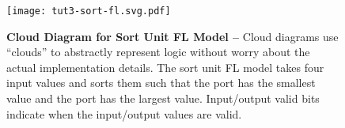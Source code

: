 
\begin{figure}[b]
  \cbxcaptionsize

  \hfill
  \begin{varwidth}[t]{\tw}
    \vspace{0pt}

    \texttt{[image: tut3-sort-fl.svg.pdf]}

  \end{varwidth}
  \hfill%
  \begin{minipage}[t]{0.44\tw}
    \vspace{0pt}

    \caption{\textbf{Cloud Diagram for Sort Unit FL Model --} Cloud
      diagrams use ``clouds'' to abstractly represent logic without worry
      about the actual implementation details. The sort unit FL model
      takes four input values and sorts them such that the 
      port has the smallest value and the  port has the
      largest value. Input/output valid bits indicate when the
      input/output values are valid.}
    \label{fig-tut3-sort-fl}

  \end{minipage}
  \hfill\mbox{}

\end{figure}

